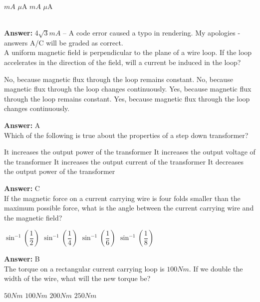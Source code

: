 \documentclass[12pt,addpoints]{exam}
\begin{document}
{{{\begin{questions}
\begin{oneparchoices}
						 $mA$
						 $\mu$A
						 $mA$
						 $\mu$A
					\end{oneparchoices} \\
					\textbf{Answer:} 4$\sqrt{3}mA$ -- A code error caused a typo in rendering. My apologies - answers A/C will be graded as correct.\\ 
					\question A uniform magnetic field is perpendicular to the plane of a wire loop. If the loop accelerates in the direction of the field, will a current be induced in the loop?
					\begin{choices}
						\choice No, because magnetic flux through the loop remains constant.
						\choice No, because magnetic flux through the loop changes continuously.
						\choice Yes, because magnetic flux through the loop remains constant.
						\choice Yes, because magnetic flux through the loop changes continuously.
					\end{choices}
					\textbf{Answer:} A\\ 
					\question Which of the following is true about the properties of a step down transformer? \\
					\begin{choices}
						\choice It increases the output power of the transformer
						\choice It increases the output voltage of the transformer
						\choice It increases the output current of the transformer
						\choice It decreases the output power of the transformer
					\end{choices}
					\textbf{Answer:} C\\ 
					\question If the magnetic force on a current carrying wire is four folds smaller than the maximum possible force, what is the angle between the current carrying wire and the magnetic field? \\
					\begin{oneparchoices}
						\choice $\sin^{-1}(\dfrac{1}{2})$
						\choice $\sin^{-1}(\dfrac{1}{4})$
						\choice $\sin^{-1}(\dfrac{1}{6})$
						\choice $\sin^{-1}(\dfrac{1}{8})$
					\end{oneparchoices}
					\textbf{Answer:} B\\ 
					\question The torque on a rectangular current carrying loop is $100Nm$. If we double the width of the wire, what will the new torque be? \\ \begin{oneparchoices}
						\choice $50Nm$
						\choice $100Nm$
						\choice $200Nm$
						\choice $250Nm$
					\end{oneparchoices}

\end{questions}}}}
\end{document}
